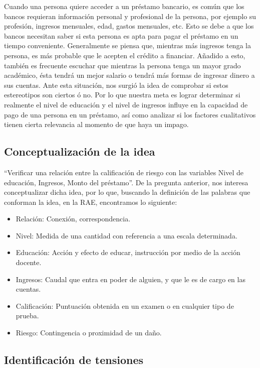 \documentclass[
  letterpaper,
  DIV=11,
  numbers=noendperiod]{scrreprt}
\begin{document}
Cuando una persona quiere acceder a un préstamo bancario, es común que
los bancos requieran información personal y profesional de la persona,
por ejemplo su profesión, ingresos mensuales, edad, gastos mensuales,
etc. Esto se debe a que los bancos necesitan saber si esta persona es
apta para pagar el préstamo en un tiempo conveniente. Generalmente se
piensa que, mientras más ingresos tenga la persona, es más probable que
le acepten el crédito a financiar. Añadido a esto, también es frecuente
escuchar que mientras la persona tenga un mayor grado académico, ésta
tendrá un mejor salario o tendrá más formas de ingresar dinero a sus
cuentas. Ante esta situación, nos surgió la idea de comprobar si estos
estereotipos son ciertos ó no. Por lo que nuestra meta es lograr
determinar si realmente el nivel de educación y el nivel de ingresos
influye en la capacidad de pago de una persona en un préstamo, así como
analizar si los factores cualitativos tienen cierta relevancia al
momento de que haya un impago.

\subsection{Conceptualización de la
idea}\label{conceptualizaciuxf3n-de-la-idea}

``Verificar una relación entre la calificación de riesgo con las
variables Nivel de educación, Ingresos, Monto del préstamo''. De la
pregunta anterior, nos interesa conceptualizar dicha idea, por lo que,
buscando la definición de las palabras que conforman la idea, en la RAE,
encontramos lo siguiente:

\begin{itemize}
\item
  Relación: Conexión, correspondencia.
\item
  Nivel: Medida de una cantidad con referencia a una escala determinada.
\item
  Educación: Acción y efecto de educar, instrucción por medio de la
  acción docente.
\item
  Ingresos: Caudal que entra en poder de alguien, y que le es de cargo
  en las cuentas.
\item
  Calificación: Puntuación obtenida en un examen o en cualquier tipo de
  prueba.
\item
  Riesgo: Contingencia o proximidad de un daño.
\end{itemize}

\subsection{Identificación de
tensiones}\label{identificaciuxf3n-de-tensiones}
\end{document}
